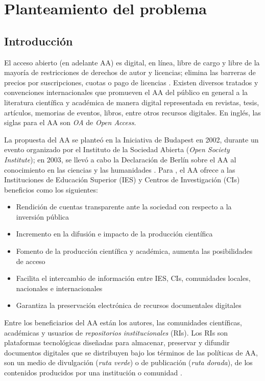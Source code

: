 \renewcommand{\chaptername}{Cap\'itulo}
\chapter{Planteamiento del problema}
\label{Planteamiento}

\section{Introducci\'on}

El acceso abierto (en adelante AA) es digital, en l\'inea, libre de cargo y libre de la ma\-yo\-r\'ia de restricciones de derechos de autor y licencias; elimina las barreras de precios por suscripciones, cuotas o pago de licencias \cite{PeterSuber2015}. Existen diversos tratados y convenciones internacionales que promueven el AA del p\'ublico en general a la literatura cient\'ifica y acad\'emica de manera digital representada en revistas, tesis, art\'iculos, memorias de eventos, libros, entre otros recursos digitales. En ingl\'es, las siglas para el AA son \textit{OA} de \textit{Open Access}.\newline

La propuesta del AA se plante\'o en la Iniciativa de Budapest en 2002, durante un evento organizado por el Instituto de la Sociedad Abierta (\textit{Open Society Institute}); en 2003, se llev\'o a cabo la Declaraci\'on de Berl\'in sobre el AA al conocimiento en las ciencias y las humanidades \cite{para2010abierto}.
Para \cite{BeneficiosAA}, el AA ofrece a las Instituciones de Edu\-caci\'on Superior (IES) y Centros de Investigaci\'on (CIs) beneficios como los siguientes: 
\begin{itemize}
\item Rendici\'on de cuentas transparente ante la sociedad con respecto a la inversi\'on p\'ublica
\item Incremento en la difusi\'on e impacto de la producci\'on cient\'ifica  
\item Fomento de la producci\'on cient\'ifica y acad\'emica, aumenta las posibilidades de acceso 
\item Facilita el intercambio de informaci\'on entre IES, CIs, comunidades locales, nacionales e internacionales
\item Garantiza la preservaci\'on electr\'onica de recursos documentales digitales
\end{itemize}
 
Entre los beneficiarios del AA est\'an los autores, las comunidades cient\'ificas, acad\'emicas y usuarios de \emph{repositorios institucionales} (RIs). Los RIs son plataformas tecnol\'ogicas dise\~{n}adas para almacenar, preservar y difundir documentos digitales que se distribuyen bajo los t\'erminos de las pol\'iticas de AA, son un medio de divulgaci\'on (\textit{ruta verde}) o de publicaci\'on (\textit{ruta dorada}), de los contenidos producidos por una instituci\'on o comunidad \cite{RutaVerdeDorada}. \newline

